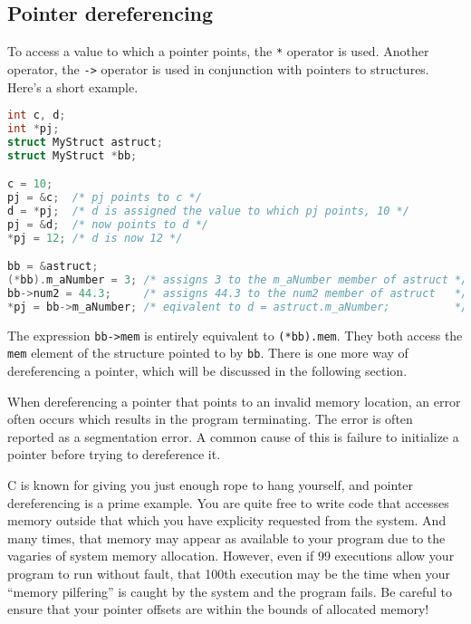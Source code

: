 \subsection{Pointer dereferencing}
To access a value to which a pointer points, the \texttt{*} operator is used.
Another operator, the \texttt{-\textgreater{}} operator is used in conjunction
with pointers to structures. Here's a short example.
\lstset{basicstyle=\scriptsize, numbers=left, captionpos=b, tabsize=4}
\begin{lstlisting}[caption=Section \thesection listing \arabic{pntcnt},language={C},
breaklines=true,xleftmargin=15pt,label=lst:section\thesection listing\arabic{pntcnt}]
int c, d;
int *pj;
struct MyStruct astruct;
struct MyStruct *bb;

c = 10;
pj = &c;  /* pj points to c */
d = *pj;  /* d is assigned the value to which pj points, 10 */
pj = &d;  /* now points to d */
*pj = 12; /* d is now 12 */

bb = &astruct;
(*bb).m_aNumber = 3; /* assigns 3 to the m_aNumber member of astruct */
bb->num2 = 44.3;     /* assigns 44.3 to the num2 member of astruct   */
*pj = bb->m_aNumber; /* eqivalent to d = astruct.m_aNumber;          */
\end{lstlisting}

The expression \texttt{bb-\textgreater{}mem} is entirely equivalent to
\texttt{(*bb).mem}. They both access the \texttt{mem} element of the structure
pointed to by \texttt{bb}. There is one more way of dereferencing a pointer,
which will be discussed in the following section.

When dereferencing a pointer that points to an invalid memory location, an
error often occurs which results in the program terminating. The error is often
reported as a segmentation error. A common cause of this is failure to
initialize a pointer before trying to dereference it.

C is known for giving you just enough rope to hang yourself, and pointer
dereferencing is a prime example. You are quite free to write code that
accesses memory outside that which you have explicity requested from the
system. And many times, that memory may appear as available to your program due
to the vagaries of system memory allocation. However, even if 99 executions
allow your program to run without fault, that 100th execution may be the time
when your ``memory pilfering'' is caught by the system and the program fails.
Be careful to ensure that your pointer offsets are within the bounds of
allocated memory!

